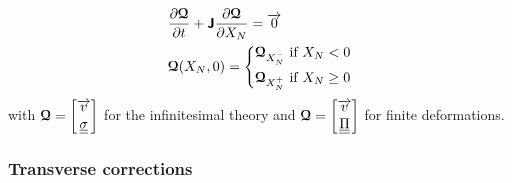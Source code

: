 \begin{equation}
  \label{eq:RP_quasilinear}
  \begin{aligned}
    &\drond{\Qcb}{t} + \Jbsf \drond{\Qcb}{X_N} = \vect{0}  \\
    & \Qcb(X_N,0)= \left\lbrace 
      \begin{aligned}
        & \Qcb_{X_N^-} \text{ if } X_N <0 \\
        & \Qcb_{X_N^{+}} \text{ if } X_N \geq 0
      \end{aligned}
        \right.
  \end{aligned}
\end{equation}
with ${\boldsymbol{\mathcal{Q}}}=\left[\begin{matrix}{\overrightarrow{v}} \\ {\underline{\underline{\sigma}}}\end{matrix}\right]$ for the infinitesimal theory and ${\boldsymbol{\mathcal{Q}}} = \left[\begin{matrix}{\overrightarrow{v}} \\ {\underline{\underline{\Pi}}}\end{matrix}\right]$ for finite deformations.

\subsubsection*{Transverse corrections}

